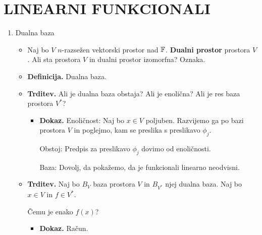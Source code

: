 \section{LINEARNI FUNKCIONALI}
\begin{enumerate}
    \item Dualna baza
    \begin{itemize}
        \item Naj bo $V$ $n$-razsežen vektorski prostor nad $\mathbb{F}$. \textbf{Dualni prostor} prostora $V$. Ali sta prostora $V$ in dualni prostor izomorfna? Oznaka.
        \item \colorbox{purple!30}{\textbf{Definicija.}} Dualna baza.
        \item \colorbox{blue!30}{\textbf{Trditev.}} Ali je dualna baza obstaja? Ali je enolična? Ali je res baza prostora $V^*$?
        \begin{itemize}
            \item \colorbox{green!30}{\textbf{Dokaz.}} Enoličnost: Naj bo $x \in V$ poljuben. Razvijemo ga po bazi prostora $V$ in poglejmo, kam se preslika s preslikavo $\phi_j$.
            
            Obstoj: Predpis za preslikavo $\phi_j$ dovimo od enoličnosti.

            Baza: Dovolj, da pokažemo, da je funkcionali linearno neodvisni.            
        \end{itemize}
        \item \colorbox{blue!30}{\textbf{Trditev.}} Naj bo $B_V$ baza prostora $V$ in $B_{V^*}$ njej dualna baza. Naj bo $x \in V$ in $f \in V^*$. 
        
        Čemu je enako $f(x)$?
        \begin{itemize}
            \item \colorbox{green!30}{\textbf{Dokaz.}} Račun.            
        \end{itemize}
    \end{itemize}
    

\end{enumerate}
